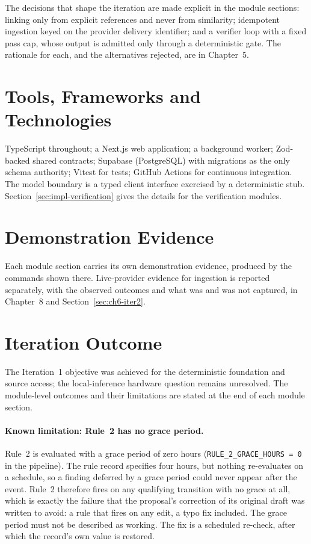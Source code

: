 The decisions that shape the iteration are made explicit in the module sections:
linking only from explicit references and never from similarity; idempotent
ingestion keyed on the provider delivery identifier; and a verifier loop with a
fixed pass cap, whose output is admitted only through a deterministic gate. The
rationale for each, and the alternatives rejected, are in Chapter~5.

\section{Tools, Frameworks and Technologies}

TypeScript throughout; a Next.js web application; a background worker; Zod-backed
shared contracts; Supabase (PostgreSQL) with migrations as the only schema
authority; Vitest for tests; GitHub Actions for continuous integration. The
model boundary is a typed client interface exercised by a deterministic stub.
Section~\ref{sec:impl-verification} gives the details for the verification
modules.

\section{Demonstration Evidence}

Each module section carries its own demonstration evidence, produced by the
commands shown there. Live-provider evidence for ingestion is reported
separately, with the observed outcomes and what was and was not captured, in
Chapter~8 and Section~\ref{sec:ch6-iter2}.

\section{Iteration Outcome}
\label{sec:ch6-outcome}

The Iteration~1 objective was achieved for the deterministic foundation and
source access; the local-inference hardware question remains unresolved. The
module-level outcomes and their limitations are stated at the end of each module
section.

\paragraph{Known limitation: Rule~2 has no grace period.} Rule~2 is evaluated
with a grace period of zero hours (\texttt{RULE\_2\_GRACE\_HOURS = 0} in the
pipeline). The rule record specifies four hours, but nothing re-evaluates on a
schedule, so a finding deferred by a grace period could never appear after the
event. Rule~2 therefore fires on any qualifying transition with no grace at all,
which is exactly the failure that the proposal's correction of its original
draft was written to avoid: a rule that fires on any edit, a typo fix included.
The grace period must not be described as working. The fix is a scheduled
re-check, after which the record's own value is restored.

